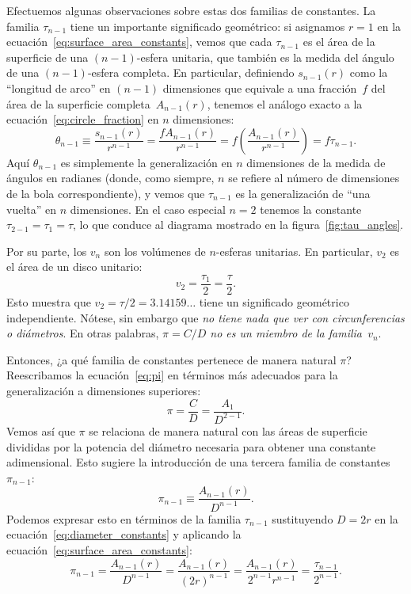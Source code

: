 Efectuemos algunas observaciones sobre estas dos familias de constantes. La familia $\tau_{n-1}$ tiene un importante significado geométrico: si asignamos $r=1$ en la ecuación~\eqref{eq:surface_area_constants}, vemos que cada $\tau_{n-1}$ es el área de la superficie de una $(n-1)$-esfera unitaria, que también es la medida del ángulo de una $(n-1)$-esfera completa. En particular, definiendo $s_{n-1}(r)$ como la ``longitud de arco'' en $(n-1)$ dimensiones que equivale a una fracción~$f$ del área de la superficie completa~$A_{n-1}(r)$, tenemos el análogo exacto a la ecuación~\eqref{eq:circle_fraction} en $n$ dimensiones:
\[
\theta_{n-1} \equiv \frac{s_{n-1}(r)}{r^{n-1}} = \frac{f A_{n-1}(r)}{r^{n-1}} = f\left(\frac{A_{n-1}(r)}{r^{n-1}}\right) = f\tau_{n-1}.
\]
Aquí $\theta_{n-1}$ es simplemente la generalización en $n$ dimensiones de la medida de ángulos en radianes (donde, como siempre, $n$ se refiere al número de dimensiones de la bola correspondiente), y vemos que $\tau_{n-1}$ es la generalización de ``una vuelta'' en $n$ dimensiones. En el caso especial $n=2$ tenemos la constante $\tau_{2-1} = \tau_1 = \tau$, lo que conduce al diagrama mostrado en la figura~\ref{fig:tau_angles}. 

Por su parte, los $v_n$ son los volúmenes de $n$-esferas unitarias. En particular, $v_2$ es el área de un disco unitario:
\[
v_2 = \frac{\tau_1}{2} = \frac{\tau}{2}.
\]
Esto muestra que $v_2 = \tau/2 = 3.14159\ldots$ tiene un significado geométrico independiente. Nótese, sin embargo que \emph{no tiene nada que ver con circunferencias o diámetros}. En otras palabras, \emph{$\pi = C/D$ no es un miembro de la familia~$v_n$}.

Entonces, ¿a qué familia de constantes pertenece de manera natural $\pi$?
Reescribamos la ecuación~\eqref{eq:pi} en términos más adecuados para la generalización a dimensiones superiores:
\[
\pi = \frac{C}{D} = \frac{A_1}{D^{2-1}}.
\]
Vemos así que $\pi$ se relaciona de manera natural con las áreas de superficie divididas por la potencia del diámetro necesaria para obtener una constante adimensional. Esto sugiere la introducción de una tercera familia de constantes~$\pi_{n-1}$:
\begin{equation}
\label{eq:diameter_constants}
\pi_{n-1} \equiv \frac{A_{n-1}(r)}{D^{n-1}}.
\end{equation}
Podemos expresar esto en términos de la familia $\tau_{n-1}$ sustituyendo $D = 2r$ en la ecuación~\eqref{eq:diameter_constants} y aplicando la ecuación~\eqref{eq:surface_area_constants}:
\[
\pi_{n-1} = \frac{A_{n-1}(r)}{D^{n-1}} = \frac{A_{n-1}(r)}{(2r)^{n-1}} =
\frac{A_{n-1}(r)}{2^{n-1}r^{n-1}} = \frac{\tau_{n-1}}{2^{n-1}}.
\]

